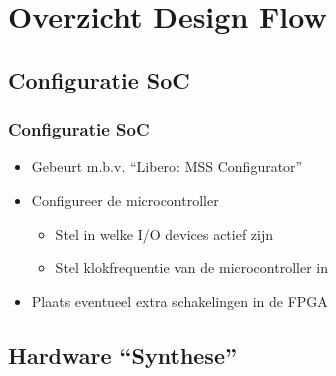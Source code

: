 \documentclass{beamer}
\begin{document}
\section{Overzicht Design Flow}


\subsection{Configuratie SoC}

\begin{frame} 
\frametitle{Configuratie SoC}
  \begin{itemize}
    \item Gebeurt m.b.v. ``Libero: MSS Configurator''
    \item Configureer de microcontroller
    \begin{itemize}
      \item Stel in welke I/O devices actief zijn
      \item Stel klokfrequentie van de microcontroller in
    \end{itemize}
    \item Plaats eventueel extra schakelingen in de FPGA
  \end{itemize}
\end{frame}

\subsection{Hardware ``Synthese''}
\end{document}
